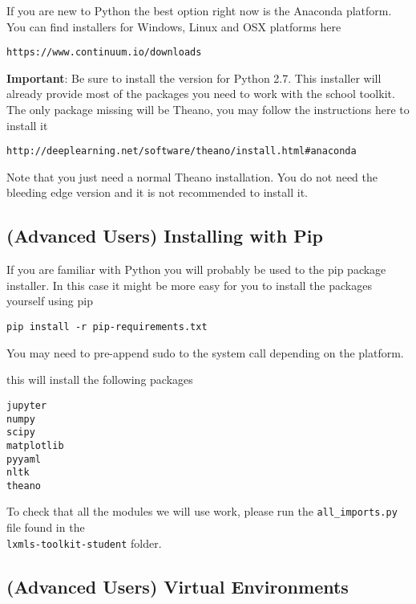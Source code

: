 If you are new to Python the best option right now is the Anaconda platform. You can find installers for Windows, Linux and OSX platforms here

\begin{verbatim}
https://www.continuum.io/downloads
\end{verbatim}

\textbf{Important}: Be sure to install the version for Python 2.7. This installer will already provide most of the packages you need to work with the school toolkit. The only package missing will be Theano, you may follow the instructions here to install it

\begin{verbatim}
http://deeplearning.net/software/theano/install.html#anaconda
\end{verbatim}

\noindent Note that you just need a normal Theano installation. You do not need the bleeding edge version and it is not recommended to install it.

\subsection{(Advanced Users) Installing with Pip}

If you are familiar with Python you will probably be used to the pip package installer. In this case it might be more easy for you to install the packages yourself using pip

\begin{verbatim}
pip install -r pip-requirements.txt 
\end{verbatim}

You may need to pre-append sudo to the system call depending on the platform.

\noindent this will install the following packages

\begin{verbatim}
jupyter
numpy
scipy
matplotlib
pyyaml
nltk
theano 
\end{verbatim}

To check that all the modules we will use work, please run the
\verb+all_imports.py+ file found in the \\ \verb+lxmls-toolkit-student+ folder.

\subsection{(Advanced Users) Virtual Environments}

